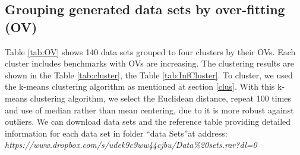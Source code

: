 \subsection {Grouping generated data sets by over-fitting (OV)}
\label{Gro}
Table \ref{tab:OV} shows 140 data sets grouped to four clusters by their OVs. Each cluster includes benchmarks with OVs are increasing. The clustering results are shown in the Table \ref{tab:cluster}, the Table \ref{tab:InfCluster}.  To cluster, we used the k-means clustering algorithm as mentioned at section \ref{clus}. With this k-means clustering algorithm, we select the Euclidean distance,  repeat 100 times and use of median rather than mean centering, due to it is more robust against outliers. We can download data sets and the reference table providing detailed information for each data set in folder \textquotedblleft data Sets\textquotedblright at address:\\ \textit{https://www.dropbox.com/s/udek9c9ww44cjbu/Data\%20sets.rar?dl=0}
